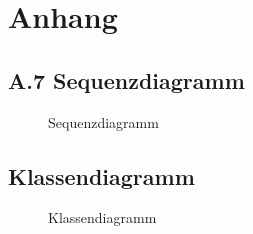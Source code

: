 \section{Anhang}
\clearpage
\setcounter{page}{8}
\subsection*{A.7 Sequenzdiagramm}
\label{app:Sequenz}
\begin{figure}[!htb]
    \centering
    \caption{Sequenzdiagramm}
\end{figure}
\clearpage

\subsection{Klassendiagramm}
\label{app:Klassendiagramm}
\begin{figure}[!htb]
\centering
{}
\caption{Klassendiagramm}
\end{figure}

